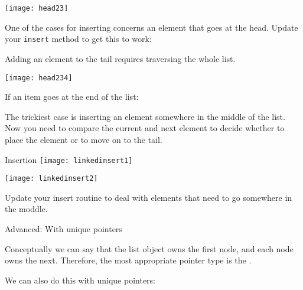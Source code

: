\par

\texttt{[image: head23]}

\begin{exercise}
  \label{ex:linklist-insert-head}
  One of the cases for inserting concerns an element that goes at the
  head. Update your \lstinline{insert} method to get this to work:
\end{exercise}

\par

Adding an element to the tail requires traversing the whole list.

\texttt{[image: head234]}

\begin{exercise}
  \label{ex:linklist-insert-tail}
  If an item goes at the end of the list:
\end{exercise}

\par

The trickiest case is inserting an element somewhere in the middle of the list.
Now you need to compare the current and next element to decide whether to
place the element or to move on to the tail.

\begin{block}{Insertion}
  \label{sl:linklist-insert-middle}
  \texttt{[image: linkedinsert1]}

  \texttt{[image: linkedinsert2]}
\end{block}


\begin{exercise}
  \label{ex:linklist-insert-middle}
  Update your insert routine to deal with elements
  that need to go somewhere in the moddle.
  
\end{exercise}


 {Advanced: With unique pointers}

Conceptually we can say
that the list object owns the first node, and each node owns the
next.
Therefore, the most appropriate pointer type is  the .

We can also do this with unique pointers:

